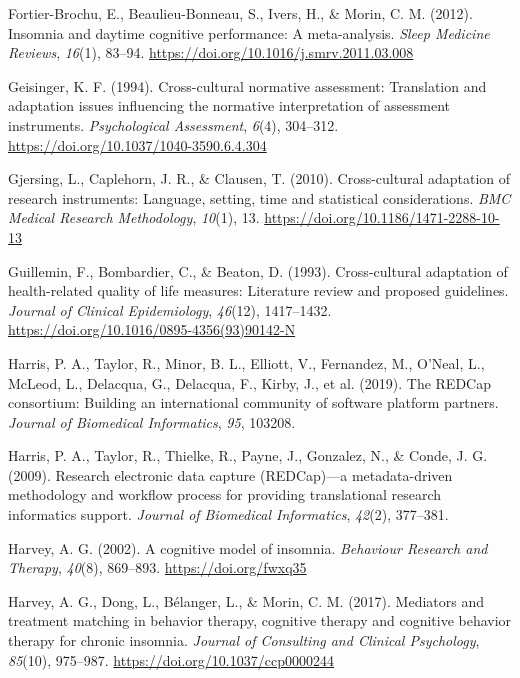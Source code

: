 \documentclass[
  ,doc,11pt, twoside,floatsintext]{apa6}
\newlength{\cslhangindent}
\newlength{\cslentryspacingunit} %
\newenvironment{CSLReferences}[2] %
 {%
  \setlength{\parindent}{0pt}
  \ifodd #1
  \let\oldpar\par
  \def\par{\hangindent=\cslhangindent\oldpar}
  \fi
  \setlength{\parskip}{#2\cslentryspacingunit}
 }%
 {}
\begin{document}
\begin{CSLReferences}{1}{0}
\leavevmode{}%
Fortier-Brochu, E., Beaulieu-Bonneau, S., Ivers, H., \& Morin, C. M. (2012). Insomnia and daytime cognitive performance: A meta-analysis. \emph{Sleep Medicine Reviews}, \emph{16}(1), 83--94. \url{https://doi.org/10.1016/j.smrv.2011.03.008}

\leavevmode{}%
Geisinger, K. F. (1994). Cross-cultural normative assessment: {Translation} and adaptation issues influencing the normative interpretation of assessment instruments. \emph{Psychological Assessment}, \emph{6}(4), 304--312. \url{https://doi.org/10.1037/1040-3590.6.4.304}

\leavevmode{}%
Gjersing, L., Caplehorn, J. R., \& Clausen, T. (2010). Cross-cultural adaptation of research instruments: Language, setting, time and statistical considerations. \emph{BMC Medical Research Methodology}, \emph{10}(1), 13. \url{https://doi.org/10.1186/1471-2288-10-13}

\leavevmode{}%
Guillemin, F., Bombardier, C., \& Beaton, D. (1993). Cross-cultural adaptation of health-related quality of life measures: {Literature} review and proposed guidelines. \emph{Journal of Clinical Epidemiology}, \emph{46}(12), 1417--1432. \url{https://doi.org/10.1016/0895-4356(93)90142-N}

\leavevmode{}%
Harris, P. A., Taylor, R., Minor, B. L., Elliott, V., Fernandez, M., O'Neal, L., McLeod, L., Delacqua, G., Delacqua, F., Kirby, J., et al. (2019). The REDCap consortium: Building an international community of software platform partners. \emph{Journal of Biomedical Informatics}, \emph{95}, 103208.

\leavevmode{}%
Harris, P. A., Taylor, R., Thielke, R., Payne, J., Gonzalez, N., \& Conde, J. G. (2009). Research electronic data capture (REDCap)---a metadata-driven methodology and workflow process for providing translational research informatics support. \emph{Journal of Biomedical Informatics}, \emph{42}(2), 377--381.

\leavevmode{}%
Harvey, A. G. (2002). A cognitive model of insomnia. \emph{Behaviour Research and Therapy}, \emph{40}(8), 869--893. \url{https://doi.org/fwxq35}

\leavevmode{}%
Harvey, A. G., Dong, L., Bélanger, L., \& Morin, C. M. (2017). Mediators and treatment matching in behavior therapy, cognitive therapy and cognitive behavior therapy for chronic insomnia. \emph{Journal of Consulting and Clinical Psychology}, \emph{85}(10), 975--987. \url{https://doi.org/10.1037/ccp0000244}


\end{CSLReferences}
\end{document}
